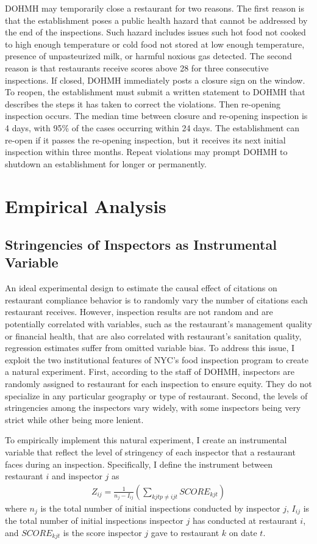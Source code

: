 \documentclass[10pt]{article} %
\begin{document}
DOHMH may temporarily close a restaurant for two reasons. The first reason is that the establishment poses a public health hazard that cannot be addressed by the end of the inspections. Such hazard includes issues such hot food not cooked to high enough temperature or cold food not stored at low enough temperature, presence of unpasteurized milk, or harmful noxious gas detected. The second reason is that restaurants receive scores above 28 for three consecutive inspections. If closed, DOHMH immediately posts a closure sign on the window. To reopen, the establishment must submit a written statement to DOHMH that describes the steps it has taken to correct the violations. Then re-opening inspection occurs. The median time between closure and re-opening inspection is 4 days, with 95\% of the cases occurring within 24 days. The establishment can re-open if it passes the re-opening inspection, but it receives its next initial inspection within three months. Repeat violations may prompt DOHMH to shutdown an establishment for longer or permanently. 

\section{Empirical Analysis}
\label{empirical_sec}

\subsection{Stringencies of Inspectors as Instrumental Variable}
\label{IV}

An ideal experimental design to estimate the causal effect of citations on restaurant compliance behavior is to randomly vary the number of citations each restaurant receives. However, inspection results are not random and are potentially correlated with variables, such as the restaurant's management quality or financial health, that are also correlated with restaurant's sanitation quality, regression estimates suffer from omitted variable bias. To address this issue, I exploit the two institutional features of NYC's food inspection program to create a natural experiment. First, according to the staff of DOHMH, inspectors are randomly assigned to restaurant for each inspection to ensure equity. They do not specialize in any particular geography or type of restaurant. Second, the levels of stringencies among the inspectors vary widely, with some inspectors being very strict while other being more lenient. 

To empirically implement this natural experiment, I create an instrumental variable that reflect the level of stringency of each inspector that a restaurant faces during an inspection. Specifically, I define the instrument between restaurant $i$ and inspector $j$ as
\begin{align}
\label{instrument}
    Z_{ij} = \frac{1}{n_{j} - I_{ij}} \left( \sum_{kjtp\neq ijt}  SCORE_{kjt}\right)
\end{align}
where $n_{j}$ is the total number of initial inspections conducted by inspector $j$, $I_{ij}$ is the total number of initial inspections inspector $j$ has conducted at restaurant $i$, and $SCORE_{kjt}$ is the score inspector $j$ gave to restaurant $k$ on date $t$. 
\end{document}
